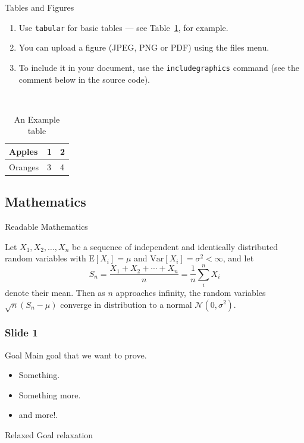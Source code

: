 \documentclass{article}
\begin{document}
\begin{frame}{Tables and Figures}

\begin{enumerate}
\item Use \texttt{tabular} for basic tables --- see Table~\ref{tab:widgets}, for example.
\item You can upload a figure (JPEG, PNG or PDF) using the files menu. 
\item To include it in your document, use the \texttt{includegraphics} command (see the comment below in the source code).
\end{enumerate}

\
\begin{table}
\label{tab:widgets}
\caption{An Example table}
\begin{tabular}{l l l}
\midrule
Apples & 1 & 2 \\
\midrule
\color{Green}Oranges &\color{Green} 3& \color{Green}4
\end{tabular}
\end{table}



\end{frame}

\subsection{Mathematics}

\begin{frame}{Readable Mathematics}

Let $X_1, X_2, \ldots, X_n$ be a sequence of independent and identically distributed random variables with $\text{E}[X_i] = \mu$ and $\text{Var}[X_i] = \sigma^2 < \infty$, and let
$$S_n = \frac{X_1 + X_2 + \cdots + X_n}{n}
      = \frac{1}{n}\sum_{i}^{n} X_i$$
denote their mean. Then as $n$ approaches infinity, the random variables $\sqrt{n}(S_n - \mu)$ converge in distribution to a normal $\mathcal{N}(0, \sigma^2)$.

\end{frame}


\begin{frame}

\frametitle{Slide 1}
\pause
\begin{block}{Goal}
Main goal that we want to prove.
\end{block}
\pause

\begin{itemize}
\item \color{RedOrange} Something.
\pause
\item \color{Green}
 Something more.
\pause
\item and more!.
\end{itemize}
\pause

\begin{block}{Relaxed Goal}
relaxation
\end{block}
\end{frame}
\end{document}
